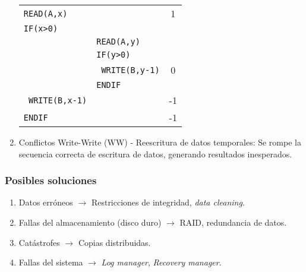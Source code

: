 \begin{enumerate}
{\begin{tabular}{ll|c}
      \texttt{READ(A,x)}      &                         & 1    \\
      \texttt{IF(x>0)}        &                         &      \\
                              & \texttt{READ(A,y)}      &      \\
                              & \texttt{IF(y>0)}        &      \\
                              & \texttt{  WRITE(B,y-1)} & 0    \\
                              & \texttt{ENDIF}          &      \\
      \texttt{  WRITE(B,x-1)} &                         & -1   \\
      \texttt{ENDIF}          &                         & -1   \\
    \end{tabular}
    \label{example:conflictRW}
  }
  \item Conflictos Write-Write (WW) - Reescritura de datos temporales: Se rompe la secuencia correcta de escritura de datos, generando resultados inesperados.
\end{enumerate}

\subsubsection{Posibles soluciones}
\begin{enumerate}
  \item Datos erróneos $\rightarrow$ Restricciones de integridad, \textit{data cleaning}.
  \item Fallas del almacenamiento (disco duro) $\rightarrow$ RAID, redundancia de datos.
  \item Catástrofes $\rightarrow$ Copias distribuidas.
  \item Fallas del sistema $\rightarrow$ \textit{Log manager}, \textit{Recovery manager}.
\end{enumerate}

